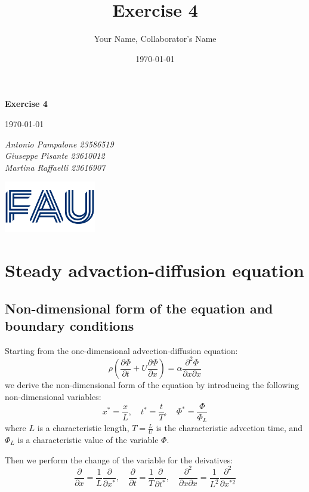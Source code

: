 \documentclass{article}
\title{Exercise 4}
\author{Your Name, Collaborator's Name}
\date{\today}
\begin{document}
\begin{titlepage}
    \centering
    \vspace*{1in}
    
    {\Huge\bfseries Exercise 4\par}
    \vspace{1.5cm}
    {\Large \today\par}
    \vspace{1.5cm}
    {\Large\itshape Antonio Pampalone 23586519 \\ Giuseppe Pisante 23610012\\ Martina Raffaelli 23616907 \par}
    
    \vfill
    \includegraphics[width=0.3\textwidth]{FAU-Logo.png}\par\vspace{1cm} %
   
\end{titlepage}

\newpage
\small
\section{Steady advaction-diffusion equation}
\subsection{Non-dimensional form of the equation and boundary conditions}
Starting from the one-dimensional advection-diffusion equation:
\begin{equation} \label{initialeq}
    \rho \left(\frac{\partial \Phi}{\partial t} + U \frac{\partial \Phi}{\partial x}\right) = \alpha \frac{\partial^2 \Phi}{\partial x \partial x} 
\end{equation}
we derive the non-dimensional form of the equation by introducing the following non-dimensional variables:
\[
    x^* = \frac{x}{L}, \quad t^* = \frac{t}{T}, \quad \Phi^* = \frac{\Phi }{\Phi_L}
\]
where $L$ is a characteristic length, $T = \tfrac{L}{U}$ is the characteristic advection time, and $\Phi_L$ is a characteristic value of the variable $\Phi$.

Then we perform the change of the variable for the deivatives:
\[
    \frac{\partial}{\partial x} = \frac{1}{L} \frac{\partial}{\partial x^*}, \quad \frac{\partial}{\partial t} = \frac{1}{T} \frac{\partial}{\partial t^*}, \quad \frac{\partial^2}{\partial x \partial x} = \frac{1}{L^2} \frac{\partial^2}{\partial x^{*2}}
\]
\end{document}

